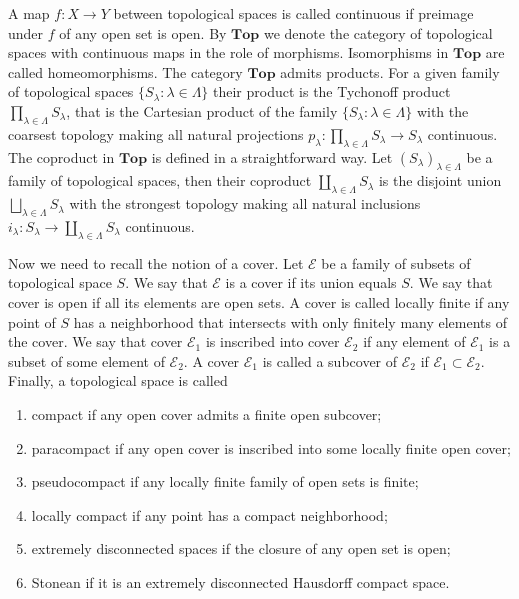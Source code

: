 A map $f:X\to Y$ between topological spaces is called continuous if preimage
under $f$ of any open set is open. By $\mathbf{Top}$ we denote the category of
topological spaces with continuous maps in the role of morphisms. Isomorphisms
in $\mathbf{Top}$ are called homeomorphisms. The category $\mathbf{Top}$ admits
products. For a given family of topological spaces $
\{S_\lambda:\lambda\in\Lambda \}$ their product is the Tychonoff product
$\prod_{\lambda\in\Lambda}S_\lambda$, that is the Cartesian product of the
family $ \{S_\lambda:\lambda\in\Lambda \}$ with the coarsest topology making all
natural projections $p_\lambda:\prod_{\lambda\in\Lambda}S_\lambda\to S_\lambda$
continuous. The coproduct in $\mathbf{Top}$ is defined in a straightforward way.
Let $(S_\lambda)_{\lambda\in\Lambda}$ be a family of topological spaces, then their
coproduct $\coprod_{\lambda\in\Lambda} S_\lambda$ is the disjoint union 
$\bigsqcup_{\lambda\in\Lambda} S_\lambda$ with the strongest topology making all
natural inclusions $i_\lambda:S_\lambda\to \coprod_{\lambda\in\Lambda}S_\lambda$ 
continuous.

Now we need to recall the notion of a cover.
Let $\mathcal{E}$ be a family of subsets of topological space $S$. We say that
$\mathcal{E}$ is a cover if its union equals $S$. We say that cover is open if
all its elements are open sets. A cover is called locally finite if any point of
$S$ has a neighborhood that intersects with only finitely many elements of the cover.
We say that cover $\mathcal{E}_1$ is inscribed into cover $\mathcal{E}_2$ if any
element of $\mathcal{E}_1$ is a subset of some element of $\mathcal{E}_2$. A
cover $\mathcal{E}_1$ is called a subcover of $\mathcal{E}_2$ if
$\mathcal{E}_1\subset\mathcal{E}_2$. Finally, a topological space is called 
\begin{enumerate}[label = (\roman*)]
  \item compact if any open cover admits a finite open subcover; 

  \item paracompact if any open cover is inscribed into some locally finite
  open cover;
  
  \item pseudocompact if any locally finite family of open sets is finite;

  \item locally compact if any point has a compact neighborhood;

  \item extremely disconnected spaces if the closure of any open set is
  open;

  \item Stonean if it is an extremely disconnected Hausdorff compact space.
\end{enumerate}

